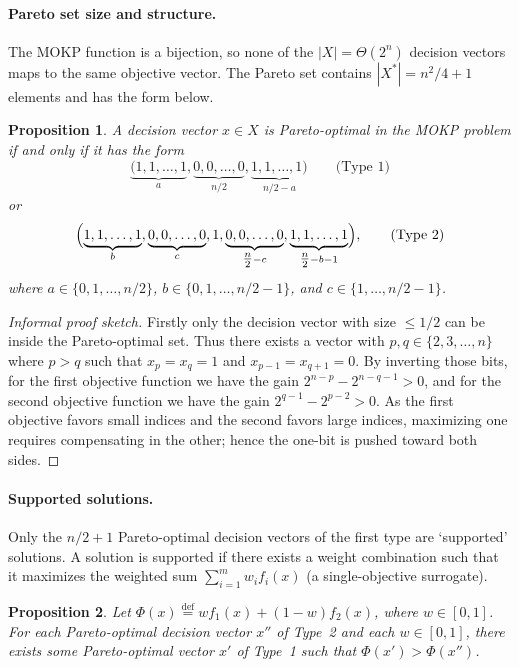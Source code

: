 \documentclass[a4paper, 11pt]{report}
\newtheorem{proposition}{Proposition}
\theoremstyle{remark}
\begin{document}
\paragraph{Pareto set size and structure.}
The MOKP function is a bijection, so none of the $|X|=\Theta(2^n)$ decision vectors maps to the same objective vector. 
The Pareto set contains $|X^*|=n^2/4+1$ elements and has the form below.

\begin{proposition}\label{prop:type-forms}
A decision vector $x\in X$ is Pareto-optimal in the MOKP problem if and only if it has the form
\[
\underbrace{(1,1,\ldots,1}_{a},
\underbrace{0,0,\ldots,0}_{n/2},
\underbrace{1,1,\ldots,1)}_{n/2-a}
\qquad\text{(Type 1)}
\]
or
\[
\Bigl(
\underbrace{1,1,\ldots,1}_{b},
\underbrace{0,0,\ldots,0}_{c},
1,
\underbrace{0,0,\ldots,0}_{\tfrac{n}{2}-c},
\underbrace{1,1,\ldots,1}_{\tfrac{n}{2}-b-1}
\Bigr),\qquad\text{(Type 2)}
\]
where $a\in\{0,1,\ldots,n/2\}$, $b\in\{0,1,\ldots,n/2-1\}$, and $c\in\{1,\ldots,n/2-1\}$.
\end{proposition}

\begin{proof}[Informal proof sketch]
Firstly only the decision vector with size $\leq 1/2$ can be inside the Pareto-optimal set. Thus there exists a vector with 
$p,q\in\{2,3,\ldots,n\}$ where $p>q$ such that $x_p=x_q=1$ and $x_{p-1}=x_{q+1}=0$. By inverting those bits, for the first objective function we have the gain 
$2^{n-p}-2^{n-q-1}>0$, and for the second objective function we have the gain $2^{q-1}-2^{p-2}>0$. As the first objective favors small indices and the second 
favors large indices, maximizing one requires compensating in the other; hence the one-bit is pushed toward both sides.
\end{proof}

\paragraph{Supported solutions.}
Only the $n/2+1$ Pareto-optimal decision vectors of the first type are `supported' solutions. A solution is supported if there exists a weight 
combination such that it maximizes the weighted sum $\sum_{i=1}^{m}w_i f_i(x)$ (a single-objective surrogate).

\begin{proposition}\label{prop:supported}
Let $\Phi(x)\overset{\text{def}}{=}w f_1(x)+(1-w)f_2(x)$, where $w\in[0,1]$. 
For each Pareto-optimal decision vector $x''$ of Type~2 and each $w\in[0,1]$, there exists some Pareto-optimal vector $x'$ of Type~1 such that 
$\Phi(x')>\Phi(x'')$.
\end{proposition}
\end{document}
